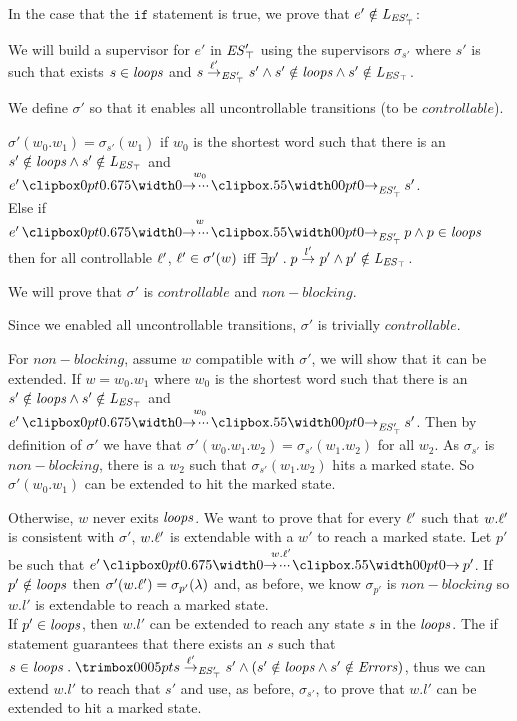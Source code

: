 In the case that the $\texttt{if}$ statement is true, we prove that $e' \notin \mathit{L_{\mathit{\mathit{ES}'_{\top}}}}$:

We will build a supervisor for $e'$ in $\mathit{\mathit{ES}'_{\top}}$ using the supervisors $\sigma_{s'}$ where $s'$ is such that exists $s \in \mathit{loops}$ and $s\overset{\ell'}{\rightarrow}_{\mathit{\mathit{ES}'_{\top}}} s'\wedge s' \notin \mathit{loops} \wedge s'\notin \mathit{L_{\mathit{\mathit{ES}_{\top}}}}$. 

We define $\sigma'$ so that it enables all uncontrollable transitions (to be $controllable$).

$\sigma'(w_0.w_1) = \sigma_{s'}(w_1)$ if $w_0$ is the shortest word such that there is an $s' \notin \mathit{loops} \wedge s'\notin \mathit{L_{\mathit{\mathit{ES}_{\top}}}}$ and $e' \runw{w_0}{\unexploredToTop{\structure'}} s'$. \\ 
Else if $e' \runw{w}{\unexploredToTop{\structure'}} p \wedge p \in \SCC$ then for all controllable $\ell'$, $\ell' \in\sigma'(w)$ iff $\exists  p' \;.\; p \overset{l'}{\rightarrow}_{} p' \wedge p' \notin \mathit{L_{\mathit{\mathit{ES}_{\top}}}}$.

We will prove that $\sigma'$ is $controllable$ and $non-blocking$.

Since we enabled all uncontrollable transitions, $\sigma'$ is trivially $controllable$.

For $non-blocking$, assume $w$ compatible with $\sigma'$, we will show that it can be extended. If $w = w_0.w_1$ where $w_0$ is the shortest word such that there is an $s' \notin \mathit{loops} \wedge s' \notin \mathit{L_{\mathit{\mathit{ES}_{\top}}}}$ and $e' \runw{w_0}{\unexploredToTop{\structure'}} s'$. Then by definition of $\sigma'$ we have that $\sigma'(w_0.w_1.w_2) = \sigma_{s'}(w_1.w_2)$ for all $w_2$. As $\sigma_{s'}$ is $non-blocking$, there is a $w_2$ such that $\sigma_{s'}(w_1.w_2)$ hits a marked state. So $\sigma'(w_0.w_1)$ can be extended to hit the marked state. 

Otherwise, $w$ never exits $\mathit{loops}$. We want to prove that for every $\ell'$ such that $w.\ell'$ is consistent with $\sigma'$, $w.\ell'$ is extendable with a $w'$ to reach a marked state. Let $p'$ be such that $e' \runw{w.\l'}{} p'$. If $p' \notin \mathit{loops}$ then $\sigma'(w.\ell') = \sigma_{p'}(\lambda)$ and, as before, we know $\sigma_{p'}$ is $non-blocking$ so $w.l'$ is extendable to reach a marked state.\\
If $p' \in \mathit{loops}$, then  $w.l'$ can be extended to reach any state $s$ in the $\mathit{loops}$. The if statement guarantees that there exists an $s$ such that $s \in \SCC \ldot \trimlst{s \step{\l'}{\unexploredToTop{\structure'}}  s'} \wedge (s' \notin \SCC \wedge s' \notin \Errors)$, thus we can extend $w.l'$ to reach that $s'$ and use, as before, $\sigma_{s'}$, to prove that $w.l'$ can be extended to hit a marked state. 

